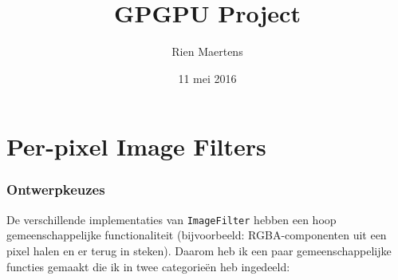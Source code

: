 \documentclass[12pt]{article}
\author{Rien Maertens}
\title{GPGPU Project}
\date{11 mei 2016}
\begin{document}
\maketitle

\part{Per-pixel Image Filters}

\section*{Ontwerpkeuzes}

De verschillende implementaties van {\tt ImageFilter} hebben een hoop gemeenschappelijke functionaliteit (bijvoorbeeld: RGBA-componenten uit een pixel halen en er terug in steken).
Daarom heb ik een paar gemeenschappelijke functies gemaakt die ik in twee categorieën heb ingedeeld:
\end{document}
